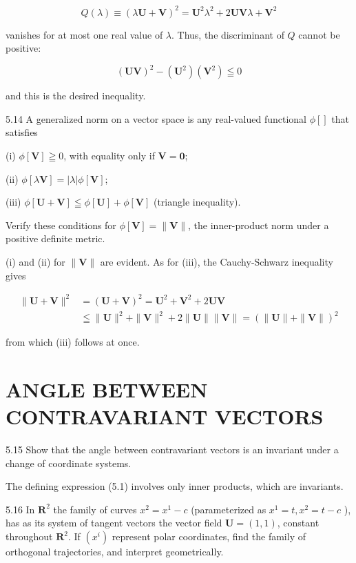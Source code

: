 \documentclass[10pt]{article}
\begin{document}
$$
Q(\lambda) \equiv(\lambda \mathbf{U}+\mathbf{V})^{2}=\mathbf{U}^{2} \lambda^{2}+2 \mathbf{U} \mathbf{V} \lambda+\mathbf{V}^{2}
$$

vanishes for at most one real value of $\lambda$. Thus, the discriminant of $Q$ cannot be positive:

$$
(\mathbf{U V})^{2}-\left(\mathbf{U}^{2}\right)\left(\mathbf{V}^{2}\right) \leqq 0
$$

and this is the desired inequality.

5.14 A generalized norm on a vector space is any real-valued functional $\phi[]$ that satisfies

(i) $\phi[\mathbf{V}] \geqq 0$, with equality only if $\mathbf{V}=\mathbf{0}$;

(ii) $\phi[\lambda \mathbf{V}]=|\lambda| \phi[\mathbf{V}]$;

(iii) $\phi[\mathbf{U}+\mathbf{V}] \leqq \phi[\mathbf{U}]+\phi[\mathbf{V}]$ (triangle inequality).

Verify these conditions for $\phi[\mathbf{V}]=\|\mathbf{V}\|$, the inner-product norm under a positive definite metric.

(i) and (ii) for $\|\mathbf{V}\|$ are evident. As for (iii), the Cauchy-Schwarz inequality gives

$$
\begin{aligned}
\|\mathbf{U}+\mathbf{V}\|^{2} & =(\mathbf{U}+\mathbf{V})^{2}=\mathbf{U}^{2}+\mathbf{V}^{2}+2 \mathbf{U} \mathbf{V} \\
& \leqq\|\mathbf{U}\|^{2}+\|\mathbf{V}\|^{2}+2\|\mathbf{U}\|\|\mathbf{V}\|=(\|\mathbf{U}\|+\|\mathbf{V}\|)^{2}
\end{aligned}
$$

from which (iii) follows at once.

\section*{ANGLE BETWEEN CONTRAVARIANT VECTORS}
5.15 Show that the angle between contravariant vectors is an invariant under a change of coordinate systems.

The defining expression (5.1) involves only inner products, which are invariants.

5.16 In $\mathbf{R}^{2}$ the family of curves $x^{2}=x^{1}-c$ (parameterized as $x^{1}=t, x^{2}=t-c$ ), has as its system of tangent vectors the vector field $\mathbf{U}=(1,1)$, constant throughout $\mathbf{R}^{2}$. If $\left(x^{i}\right)$ represent polar coordinates, find the family of orthogonal trajectories, and interpret geometrically.
\end{document}
